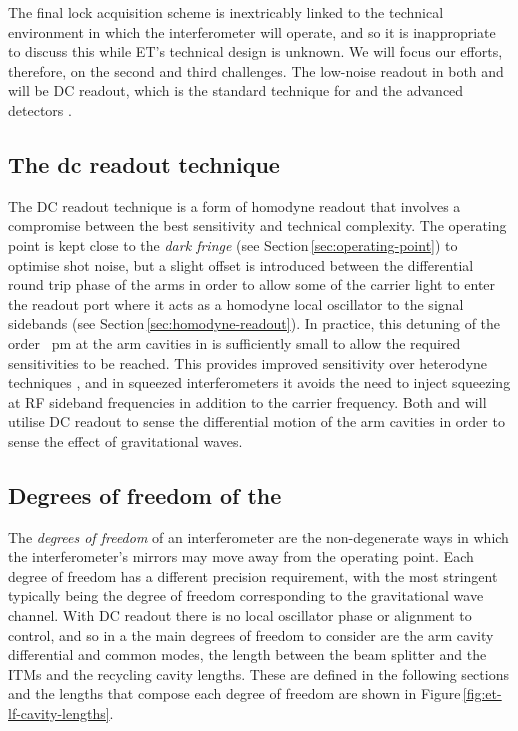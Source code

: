 The final lock acquisition scheme is inextricably linked to the technical environment in which the interferometer will operate, and so it is inappropriate to discuss this while \gls{ET}'s technical design is unknown. We will focus our efforts, therefore, on the second and third challenges. The low-noise readout in both \ETLF{} and \ETHF{} will be \gls{DC} readout, which is the standard technique for \GEOHF{} and the advanced detectors \cite{Hild2007, Ward2008, Fricke2012}.

\subsection{The dc readout technique}
The \gls{DC} readout technique is a form of homodyne readout that involves a compromise between the best sensitivity and technical complexity. The operating point is kept close to the \emph{dark fringe} (see Section\,\ref{sec:operating-point}) to optimise shot noise, but a slight offset is introduced between the differential round trip phase of the arms in order to allow some of the carrier light to enter the readout port where it acts as a homodyne local oscillator to the signal sidebands (see Section\,\ref{sec:homodyne-readout}). In practice, this detuning \textemdash of the order \SI{}{\pico\meter} at the arm cavities in \ALIGO{}\textemdash is sufficiently small to allow the required sensitivities to be reached. This provides improved sensitivity over heterodyne techniques \cite{Fricke2012}, and in squeezed interferometers it avoids the need to inject squeezing at \gls{RF} sideband frequencies in addition to the carrier frequency. Both \ETLF{} and \ETHF{} will utilise \gls{DC} readout to sense the differential motion of the arm cavities in order to sense the effect of gravitational waves.

\subsection{\label{sec:dofs-of-drfpmi}Degrees of freedom of the \DRFPMI{}}
The \emph{degrees of freedom} of an interferometer are the non-degenerate ways in which the interferometer's mirrors may move away from the operating point. Each degree of freedom has a different precision requirement, with the most stringent typically being the degree of freedom corresponding to the gravitational wave channel. With \gls{DC} readout there is no local oscillator phase or alignment to control, and so in a \DRFPMI{} the main degrees of freedom to consider are the arm cavity differential and common modes, the length between the beam splitter and the \glspl{ITM} and the recycling cavity lengths. These are defined in the following sections and the lengths that compose each degree of freedom are shown in Figure\,\ref{fig:et-lf-cavity-lengths}.

